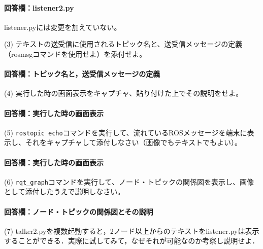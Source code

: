 \documentclass[12pt, xelatex,ja=standard,jafont=hiragino]{bxjsarticle}
\newif\ifdraft
\begin{document}
\paragraph{回答欄：listener2.py}
listener.pyには変更を加えていない。


\begin{itembox}[l]{(3)}
テキストの送受信に使用されるトピック名と、送受信メッセージの定義（rosmsgコマンドを使用せよ）を添付せよ。
\end{itembox}
\paragraph{回答欄：トピック名と，送受信メッセージの定義}
\ifdraft
トピック名と送受信メッセージの定義を貼り付ける。
メッセージの定義についての説明を自分の言葉で書く。
\fi

\begin{itembox}[l]{(4)}
実行した時の画面表示をキャプチャ、貼り付けた上でその説明をせよ。
\end{itembox}
\paragraph{回答欄：実行した時の画面表示}


\begin{itembox}[l]{(5)}
\verb|rostopic echo|コマンドを実行して、流れているROSメッセージを端末に表示し、それをキャプチャして添付しなさい（画像でもテキストでもよい）。
\end{itembox}
\paragraph{回答欄：実行した時の画面表示}


\begin{itembox}[l]{(6)}
\verb|rqt_graph|コマンドを実行して、ノード・トピックの関係図を表示し、画像として添付したうえで説明しなさい。
\end{itembox}
\paragraph{回答欄：ノード・トピックの関係図とその説明}


\begin{itembox}[l]{(7)}
talker2.pyを複数起動すると，2ノード以上からのテキストをlistener.pyは表示することができる．実際に試してみて，なぜそれが可能なのか考察し説明せよ．
\end{itembox}
\end{document}
